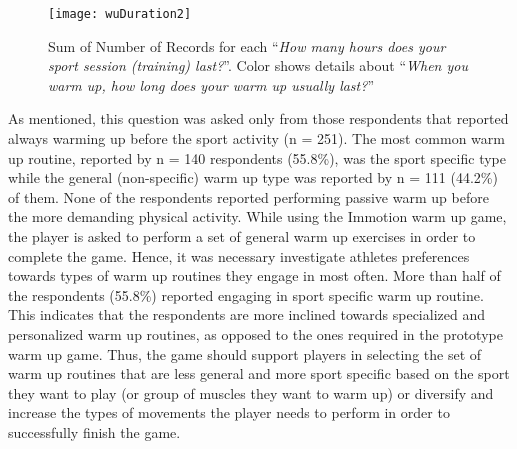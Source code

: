 \begin{figure}[h]
    \centering
    \texttt{[image: wuDuration2]}
    \caption{Sum of Number of Records for each ``\textit{How many hours does your sport session (training) last?}''. Color shows details about ``\textit{When you warm up, how long does your warm up usually last?}''}
    \label{fig:wuDuration2}
\end{figure}
As mentioned, this question was asked only from those respondents that reported always warming up before the sport activity (n = 251). The most common warm up routine, reported by n = 140 respondents (55.8\%), was the sport specific type while the general (non-specific) warm up type was reported by n = 111 (44.2\%) of them. None of the respondents reported performing passive warm up before the more demanding physical activity. While using the Immotion warm up game, the player is asked to perform a set of general warm up exercises in order to complete the game. Hence, it was necessary investigate athletes preferences towards types of warm up routines they engage in most often. More than half of the respondents (55.8\%) reported engaging in sport specific warm up routine. This indicates that the respondents are more inclined towards specialized and personalized warm up routines, as opposed to the ones required in the prototype warm up game. Thus, the game should support players in selecting the set of warm up routines that are less general and more sport specific based on the sport they want to play (or group of muscles they want to warm up) or diversify and increase the types of movements the player needs to perform in order to successfully finish the game. %
